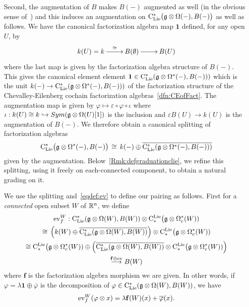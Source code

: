 \documentclass[11pt]{amsart}
\numberwithin{equation}{section}
\begin{document}
\smallskip

Second, the augmentation of $B$ makes $B(-)$ augmented as well (in the obvious sense of~\cite{Gi-NotesFactorization}) and this induces an augmentation on
${\rm C}_{\rm Lie}^*\big(\mathfrak g\otimes \Omega (-), B(-) \big)$ as well as follows. 
We have the canonical factorization algebra map  $\mathbf{1}$  defined, for any open $U$, by 
\[\xymatrix{ k(U)=k  \ar[r]^{\quad \cong}& 
B(\emptyset) \ar[r] & B(U)  } 
 \] where the last map is given by the factorization algebra structure of $B(-)$. This gives the canonical element element 
 $\mathbf{1}\in {\rm C}_{\rm Lie}^*(\mathfrak g\otimes \Omega^*(-), B(-)) )$ which is the unit $k(-)\to {\rm C}_{\rm Lie}^*(\mathfrak g\otimes \Omega^*(-), B(-)) )$
 of the factorization structure of 
 the Chevalley-Eilenberg cochain factorization algebras~\ref{dfn:CEofFact}.  
 The augmentation map is given by $\varphi\mapsto \varepsilon \circ \varphi \circ 
 \iota$ where $\iota: k(U) \cong k \hookrightarrow Sym(\mathfrak g \otimes \Omega (U) [1]) $ is the inclusion and $\varepsilon B(U)\to k(U)$ is the augmentation of 
 $B(-)$. We therefore obtain a canonical splitting of factorization algebras 
 \begin{equation}\label{eq:splittingbyaugm}
   {\rm C}_{\rm Lie}^*\big(\mathfrak g\otimes \Omega^*(-), B(-)\big)  \, \cong \, k(-) \oplus \overline{ {\rm C}_{\rm Lie}^*(\mathfrak g\otimes \Omega^*(-), B(-)) )}
 \end{equation}
given by the augmentation. Below~\ref{Rmk:defgraduationclie}, we refine  this splitting, using it  freely  on each-connected component, to obtain 
a natural grading on it.
 
 
\smallskip 

We use the splitting and~\eqref{eqdef:ev} to define our pairing as follows. First for a \emph{connected} open subset $W$ of $\mathbb R^n$, we define 
\begin{multline}\label{eq:defevforconnected}
 {\rm ev}_f^W:   {\rm C}_{\rm Lie}^* (\mathfrak g\otimes \Omega (W), B(W)) \otimes {\rm C}^{\rm Lie}_*\big(\mathfrak g \otimes \Omega_c^* (W)) 
 \\ \cong \, \left( k(W) \oplus \overline{{\rm C}_{\rm Lie}^* (\mathfrak g\otimes \Omega (W), B(W))  }\right) 
 \otimes {\rm C}^{\rm Lie}_*\big(\mathfrak g \otimes \Omega_c^* (W))  \\ \cong
 {\rm C}^{\rm Lie}_*\big(\mathfrak g \otimes \Omega_c^* (W))  \oplus  \left(\overline{{\rm C}_{\rm Lie}^* (\mathfrak g\otimes \Omega (W), B(W))  }\otimes {\rm C}^{\rm Lie}_*\big(\mathfrak g \otimes \Omega_c^* (W)) 
 \right) \\
 \stackrel{ \mathbf{f}\oplus {\rm ev}}\longrightarrow  
 B(W)
\end{multline}
where $\mathbf{f}$ is the factorization algebra morphism  we are given.
In other words, if $\varphi = \lambda \mathbf{1} \oplus \overline{\varphi}$ is the decomposition of $\varphi \in  {\rm C}_{\rm Lie}^* (\mathfrak g\otimes \Omega (W), B(W)) $,
we have 
\[ {\rm ev}_f^W(\varphi\otimes x)= \lambda \mathbf{f}(W)(x) + \overline{\varphi}(x). \]
\end{document}
